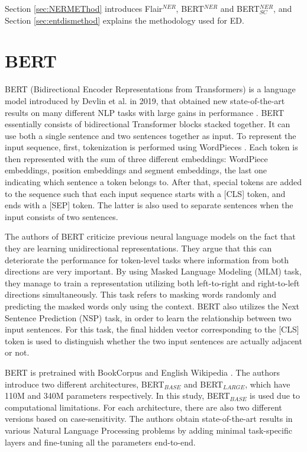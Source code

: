 \documentclass{report}
\theoremstyle{definition}
\theoremstyle{remark}
\begin{document}
Section \ref{sec:NERMEThod} introduces Flair$^{NER}$, BERT$^{NER}$ and BERT$_{SC}^{NER}$, and Section \ref{sec:entdismethod} explains the methodology used for ED.

\section{BERT}
\label{sec:BERT}

BERT (Bidirectional Encoder Representations from
Transformers) is a language model introduced by Devlin et al. in 2019, that obtained new state-of-the-art results on many different NLP tasks with large gains in performance \cite{BERT}. BERT essentially consists of bidirectional Transformer \cite{transformer} blocks stacked together. It can use both a single sentence and two sentences together as input. To represent the input sequence, first, tokenization is performed using WordPieces \cite{wordpiece}. Each token is then represented with the sum of three different embeddings: WordPiece embeddings, position embeddings and segment embeddings, the last one indicating which sentence a token belongs to. After that, special tokens are added to the sequence such that each input sequence starts with a [CLS] token, and ends with a [SEP] token. The latter is also used to separate sentences when the input consists of two sentences. 

The authors of BERT criticize previous neural language models on the fact that they are learning unidirectional representations. They argue that this can deteriorate the performance for token-level tasks where information from both directions are very important. By using Masked Language Modeling (MLM) task, they manage to train a representation utilizing both left-to-right and right-to-left directions simultaneously. This task refers to masking words randomly and predicting the masked words only using the context. BERT also utilizes the Next Sentence Prediction (NSP) task, in order to learn the relationship between two input sentences. For this task, the final hidden vector corresponding to the [CLS] token is used to distinguish whether the two input sentences are actually adjacent or not.

BERT is pretrained with BookCorpus \cite{bookscorpus} and English Wikipedia \cite{BERT}. The authors introduce two different architectures, BERT$_{BASE}$ and BERT$_{LARGE}$, which have 110M and 340M parameters respectively. In this study, BERT$_{BASE}$ is used due to computational limitations. For each architecture, there are also two different versions based on case-sensitivity. The authors obtain state-of-the-art results in various Natural Language Processing problems by adding minimal task-specific layers and fine-tuning all the parameters end-to-end.
\end{document}

